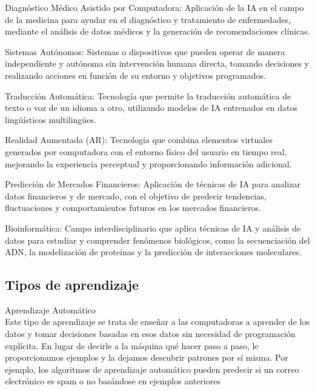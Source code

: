 \begin{myitemize}
    \item Diagnóstico Médico Asistido por Computadora: Aplicación de la IA en el 
    campo de la medicina para ayudar en el diagnóstico y tratamiento de 
    enfermedades, mediante el análisis de datos médicos y la generación de 
    recomendaciones clínicas.
    
    \item Sistemas Autónomos: Sistemas o dispositivos que pueden operar de manera 
    independiente y autónoma sin intervención humana directa, tomando 
    decisiones y realizando acciones en función de su entorno y objetivos programados.
    
    \item Traducción Automática: Tecnología que permite la traducción automática 
    de texto o voz de un idioma a otro, utilizando modelos de IA entrenados en 
    datos lingüísticos multilingües.
    
    \item Realidad Aumentada (AR): Tecnología que combina elementos virtuales 
    generados por computadora con el entorno físico del usuario en tiempo real, 
    mejorando la experiencia perceptual y proporcionando información adicional.
    
    \item Predicción de Mercados Financieros: Aplicación de técnicas de IA para analizar 
    datos financieros y de mercado, con el objetivo de predecir tendencias, 
    fluctuaciones y comportamientos futuros en los mercados financieros.
    
    \item Bioinformática: Campo interdisciplinario que aplica técnicas de IA y 
    análisis de datos para estudiar y comprender fenómenos biológicos, como 
    la secuenciación del ADN, la modelización de proteínas y la predicción de 
    interacciones moleculares.
\end{myitemize}


\subsection*{Tipos de aprendizaje}

\noindent \textcolor{Contraste4}{Aprendizaje Automático}\\

Este tipo de aprendizaje se trata de enseñar a las computadoras a aprender de los datos 
y tomar decisiones basadas en esos datos sin necesidad de programación explícita. En 
lugar de decirle a la máquina qué hacer paso a paso, le proporcionamos ejemplos y la 
dejamos descubrir patrones por sí misma. Por ejemplo, los algoritmos de aprendizaje 
automático pueden predecir si un correo electrónico es spam o no basándose en 
ejemplos anteriores\\


